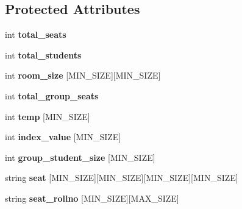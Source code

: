 \subsection*{Protected Attributes}
\begin{DoxyCompactItemize}
\item 
\hypertarget{classSeatPlan_ad964f7856664d529edb7f3ee632a3014}{int {\bfseries total\-\_\-seats}}\label{classSeatPlan_ad964f7856664d529edb7f3ee632a3014}

\item 
\hypertarget{classSeatPlan_afa3b7eb29885a08c46693ec0d2d54c4c}{int {\bfseries total\-\_\-students}}\label{classSeatPlan_afa3b7eb29885a08c46693ec0d2d54c4c}

\item 
\hypertarget{classSeatPlan_a8c7ba015ff938d94aed62ed38dfb6a0e}{int {\bfseries room\-\_\-size} \mbox{[}M\-I\-N\-\_\-\-S\-I\-Z\-E\mbox{]}\mbox{[}M\-I\-N\-\_\-\-S\-I\-Z\-E\mbox{]}}\label{classSeatPlan_a8c7ba015ff938d94aed62ed38dfb6a0e}

\item 
\hypertarget{classSeatPlan_a9c202509ac8b7158cbbf638b93efef3c}{int {\bfseries total\-\_\-group\-\_\-seats}}\label{classSeatPlan_a9c202509ac8b7158cbbf638b93efef3c}

\item 
\hypertarget{classSeatPlan_ab0d66663e81909217e96ae68a6e418a2}{int {\bfseries temp} \mbox{[}M\-I\-N\-\_\-\-S\-I\-Z\-E\mbox{]}}\label{classSeatPlan_ab0d66663e81909217e96ae68a6e418a2}

\item 
\hypertarget{classSeatPlan_a363def7a8b49b2f1a24f19d76586f137}{int {\bfseries index\-\_\-value} \mbox{[}M\-I\-N\-\_\-\-S\-I\-Z\-E\mbox{]}}\label{classSeatPlan_a363def7a8b49b2f1a24f19d76586f137}

\item 
\hypertarget{classSeatPlan_a5c57b2a59368402c2f3648ff69378888}{int {\bfseries group\-\_\-student\-\_\-size} \mbox{[}M\-I\-N\-\_\-\-S\-I\-Z\-E\mbox{]}}\label{classSeatPlan_a5c57b2a59368402c2f3648ff69378888}

\item 
\hypertarget{classSeatPlan_ac40407b1a36bbd57e16a05798627a305}{string {\bfseries seat} \mbox{[}M\-I\-N\-\_\-\-S\-I\-Z\-E\mbox{]}\mbox{[}M\-I\-N\-\_\-\-S\-I\-Z\-E\mbox{]}\mbox{[}M\-I\-N\-\_\-\-S\-I\-Z\-E\mbox{]}\mbox{[}M\-I\-N\-\_\-\-S\-I\-Z\-E\mbox{]}}\label{classSeatPlan_ac40407b1a36bbd57e16a05798627a305}

\item 
\hypertarget{classSeatPlan_a35c07d1a23c1972273c9394206817416}{string {\bfseries seat\-\_\-rollno} \mbox{[}M\-I\-N\-\_\-\-S\-I\-Z\-E\mbox{]}\mbox{[}M\-A\-X\-\_\-\-S\-I\-Z\-E\mbox{]}}\label{classSeatPlan_a35c07d1a23c1972273c9394206817416}


\end{DoxyCompactItemize}
